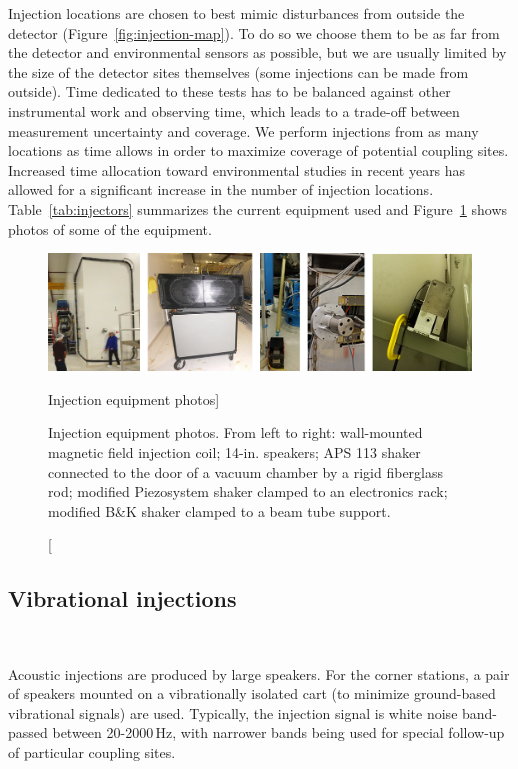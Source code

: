 Injection locations are chosen to best mimic disturbances from outside the detector (Figure~\ref{fig:injection-map}).
To do so we choose them to be as far from the detector and environmental sensors as possible, but we are usually limited by the size of the detector sites themselves (some injections can be made from outside).
Time dedicated to these tests has to be balanced against other instrumental work and observing time, which leads to a trade-off between measurement uncertainty and coverage.
We perform injections from as many locations as time allows in order to maximize coverage of potential coupling sites.
Increased time allocation toward environmental studies in recent years has allowed for a significant increase in the number of injection locations.
Table~\ref{tab:injectors} summarizes the current equipment used and Figure~\ref{fig:injection-equipment} shows photos of some of the equipment.

\begin{figure}[h!]
	\centering
	\includegraphics[width=\textwidth]{figures/noise-methods/injection-equipment.png}
	\caption
	[Injection equipment photos]
	{\raggedright
	Injection equipment photos. From left to right: wall-mounted magnetic field injection coil; 14-in. speakers; APS 113 shaker connected to the door of a vacuum chamber by a rigid fiberglass rod; modified Piezosystem shaker clamped to an electronics rack; modified B\&K shaker clamped to a beam tube support.}
	\label{fig:injection-equipment}
\end{figure}

\subsection{Vibrational injections}~\label{sec:injections-vib}

Acoustic injections are produced by large speakers.
For the corner stations, a pair of speakers mounted on a vibrationally isolated cart (to minimize ground-based vibrational signals) are used.
Typically, the injection signal is white noise band-passed between 20-2000\,Hz, with narrower bands being used for special follow-up of particular coupling sites.

